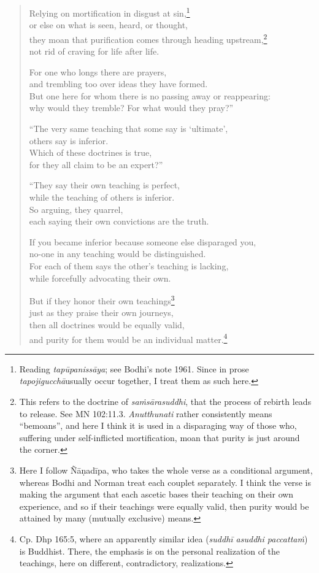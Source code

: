 \documentclass[12pt,openany]{book}%
\begin{document}
\begin{verse}
Relying on mortification in disgust at sin,\footnote{Reading \textit{\textsanskrit{tapūpanissāya}}; see Bodhi’s note 1961. Since in prose \textit{\textsanskrit{tapojigucchā}}usually occur together, I treat them as such here. } \\
or else on what is seen, heard, or thought, \\
they moan that purification comes through heading upstream,\footnote{This refers to the doctrine of \textit{\textsanskrit{saṁsārasuddhi}}, that the process of rebirth leads to release. See MN 102:11.3. \textit{Anutthunati} rather consistently means “bemoans”, and here I think it is used in a disparaging way of those who, suffering under self-inflicted mortification, moan that purity is just around the corner. } \\
not rid of craving for life after life. 

For one who longs there are prayers, \\
and trembling too over ideas they have formed. \\
But one here for whom there is no passing away or reappearing: \\
why would they tremble? For what would they pray?” 

“The very same teaching that some say is ‘ultimate’, \\
others say is inferior. \\
Which of these doctrines is true, \\
for they all claim to be an expert?” 

“They say their own teaching is perfect, \\
while the teaching of others is inferior. \\
So arguing, they quarrel, \\
each saying their own convictions are the truth. 

If you became inferior because someone else disparaged you, \\
no-one in any teaching would be distinguished. \\
For each of them says the other’s teaching is lacking, \\
while forcefully advocating their own. 

But if they honor their own teachings\footnote{Here I follow \textsanskrit{Ñāṇadīpa}, who takes the whole verse as a conditional argument, whereas Bodhi and Norman treat each couplet separately. I think the verse is making the argument that each ascetic bases their teaching on their own experience, and so if their teachings were equally valid, then purity would be attained by many (mutually exclusive) means. } \\
just as they praise their own journeys, \\
then all doctrines would be equally valid, \\
and purity for them would be an individual matter.\footnote{Cp. Dhp 165:5, where an apparently similar idea (\textit{\textsanskrit{suddhī} asuddhi \textsanskrit{paccattaṁ}}) is Buddhist. There, the emphasis is on the personal realization of the teachings, here on different, contradictory, realizations. } 


\end{verse}
\end{document}
